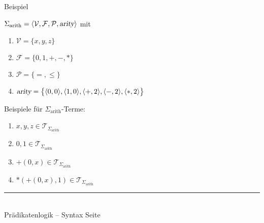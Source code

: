 \documentclass{slides}
\newcommand{\myrule}{\rule{20cm}{1mm}\\ }
\def\pair(#1,#2){\langle #1, #2 \rangle}
\newcounter{mypage}
\begin{document}

\begin{slide}{}
\normalsize
\begin{center}
Beispiel
\end{center}
\vspace{0.5cm}

\footnotesize
$\Sigma_\mathrm{arith} = \langle \mathcal{V}, \mathcal{F}, \mathcal{P},\textsl{arity}\rangle$ \quad mit
\begin{enumerate}
\item $\mathcal{V} = \{ x, y, z \}$
\item $\mathcal{F} = \{ 0, 1, \mathtt{+}, \mathtt{-}, \mathtt{*} \}$
\item $\mathcal{P} = \{\mathtt{=}, \leq\}$ 
\item $\textsl{arity} = \bigl\{ \pair(0,0), \pair(1,0), \pair(\mathtt{+},2),\pair(\mathtt{-},2), \pair(\mathtt{*},2) \bigr\}$
\end{enumerate}

Beispiele für  $\Sigma_{\mathrm{arith}}$-Terme:
\begin{enumerate}
\item $x, y, z \in \mathcal{T}_{\Sigma_{\mathrm{arith}}}$
\item $0, 1 \in \mathcal{T}_{\Sigma_{\mathrm{arith}}}$
\item $\mathtt{+}(0,x) \in \mathcal{T}_{\Sigma_{\mathrm{arith}}}$
\item $\mathtt{*}(\mathtt{+}(0,x),1) \in \mathcal{T}_{\Sigma_{\mathrm{arith}}}$
\end{enumerate}

\vspace*{\fill}
\tiny \addtocounter{mypage}{1}
\myrule
Prädikatenlogik -- Syntax  \hspace*{\fill} Seite 
\end{slide}


\end{document}

